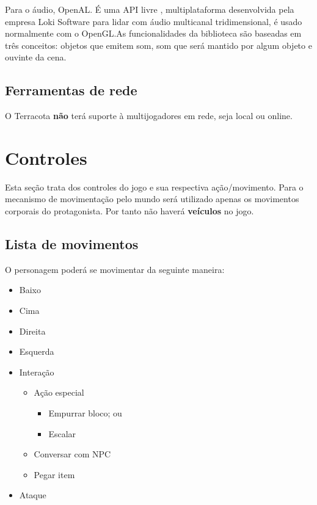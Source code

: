 \documentclass[12pt]{article}
\begin{document}
Para o áudio, OpenAL. É uma API livre , multiplataforma desenvolvida pela empresa
Loki Software para lidar com áudio multicanal tridimensional, é usado normalmente
com o OpenGL.As funcionalidades da biblioteca são baseadas em três conceitos:
objetos que emitem som, som que será mantido por algum objeto e ouvinte da cena.

\subsection{Ferramentas de rede}
O Terracota {\bf não} terá suporte à multijogadores em rede, seja local ou online.

\section{Controles}
Esta seção trata dos controles do jogo e sua respectiva ação/movimento. Para
o mecanismo de movimentação pelo mundo será utilizado apenas os movimentos
corporais do protagonista. Por tanto não haverá {\bf veículos} no jogo.

\subsection{Lista de movimentos}
O personagem poderá se movimentar da seguinte maneira:

\begin{itemize}
    \item Baixo
    \item Cima
    \item Direita
    \item Esquerda
    \item Interação
    \begin{itemize}
        \item Ação especial
        \begin{itemize}
            \item Empurrar bloco; ou
            \item Escalar
        \end{itemize}
        \item Conversar com NPC
        \item Pegar item
    \end{itemize}
    \item Ataque
\end{itemize}
\end{document}
